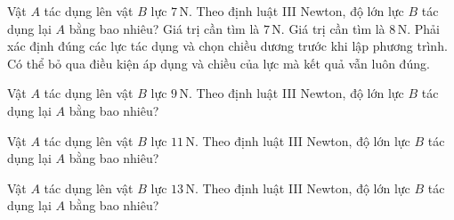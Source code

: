 \begin{ex}
Vật $A$ tác dụng lên vật $B$ lực $7\,\text{N}$. Theo định luật III Newton, độ lớn lực $B$ tác dụng lại $A$ bằng bao nhiêu?
\choiceTF
{\True Giá trị cần tìm là $7\,\text{N}$.}
{Giá trị cần tìm là $8\,\text{N}$.}
{\True Phải xác định đúng các lực tác dụng và chọn chiều dương trước khi lập phương trình.}
{Có thể bỏ qua điều kiện áp dụng và chiều của lực mà kết quả vẫn luôn đúng.}
\end{ex}

\begin{ex}
Vật $A$ tác dụng lên vật $B$ lực $9\,\text{N}$. Theo định luật III Newton, độ lớn lực $B$ tác dụng lại $A$ bằng bao nhiêu?
\end{ex}

\begin{ex}
Vật $A$ tác dụng lên vật $B$ lực $11\,\text{N}$. Theo định luật III Newton, độ lớn lực $B$ tác dụng lại $A$ bằng bao nhiêu?
\end{ex}

\begin{ex}
Vật $A$ tác dụng lên vật $B$ lực $13\,\text{N}$. Theo định luật III Newton, độ lớn lực $B$ tác dụng lại $A$ bằng bao nhiêu?
\end{ex}

